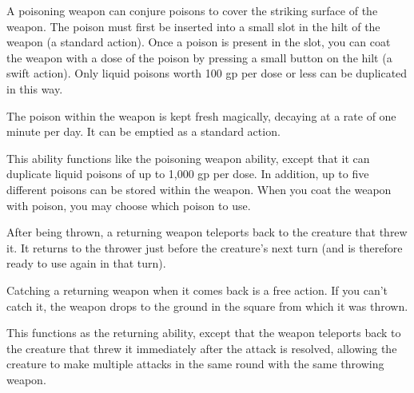 
 A poisoning weapon can conjure poisons to cover the striking surface of the weapon. The poison must first be inserted into a small slot in the hilt of the weapon (a standard action). Once a poison is present in the slot, you can coat the weapon with a dose of the poison by pressing a small button on the hilt (a swift action). Only liquid poisons worth 100 gp per dose or less can be duplicated in this way. 

The poison within the weapon is kept fresh magically, decaying at a rate of one minute per day. It can be emptied as a standard action. 


 This ability functions like the poisoning weapon ability, except that it can duplicate liquid poisons of up to 1,000 gp per dose. In addition, up to five different poisons can be stored within the weapon. When you coat the weapon with poison, you may choose which poison to use. 


 After being thrown, a returning weapon teleports back to the creature that threw it. It returns to the thrower just before the creature's next turn (and is therefore ready to use again in that turn).

Catching a returning weapon when it comes back is a free action. If you can't catch it, the weapon drops to the ground in the square from which it was thrown.


 This functions as the returning ability, except that the weapon teleports back to the creature that threw it immediately after the attack is resolved, allowing the creature to make multiple attacks in the same round with the same throwing weapon. 

